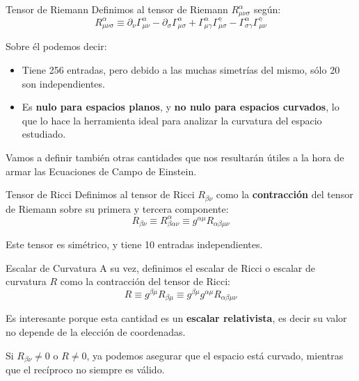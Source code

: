 \begin{remarkbox}{Tensor de Riemann}
        Definimos al tensor de Riemann $R^\alpha_{\mu \nu \sigma}$ según:
        \begin{equation}
            R^\alpha_{\mu \nu \sigma}\equiv\partial_{\nu}\Gamma^{\alpha}_{\mu \nu}-\partial_{\sigma}\Gamma^{\alpha}_{\mu\sigma}+\Gamma^{\alpha}_{\mu\gamma}\Gamma^{\gamma}_{\mu\sigma}-\Gamma^{\alpha}_{\sigma\gamma}\Gamma^{\gamma}_{\mu\nu}
            \label{riemann}
        \end{equation}
        
        Sobre él podemos decir:
        \begin{itemize}
            \item Tiene 256 entradas, pero debido a las muchas simetrías del mismo, sólo 20 son independientes.
            \item Es \textbf{nulo para espacios planos}, y \textbf{no nulo para espacios curvados}, lo que lo hace la herramienta ideal para analizar la curvatura del espacio estudiado.
        \end{itemize}
\end{remarkbox}

Vamos a definir también otras cantidades que nos resultarán útiles a la hora de armar las Ecuaciones de Campo de Einstein.

\begin{remarkbox}{Tensor de Ricci}
        Definimos al tensor de Ricci $R_{\beta\nu}$ como la \textbf{contracción} del tensor de Riemann sobre su primera y tercera componente:
        \begin{equation}
            R_{\beta\nu} \equiv R^\alpha_{\beta \alpha \nu} \equiv g^{\alpha \mu} R_{\alpha\beta\mu\nu}
            \label{ricci}
        \end{equation}
        
        Este tensor es simétrico, y tiene 10 entradas independientes.
\end{remarkbox}

\begin{remarkbox}{Escalar de Curvatura}
        A su vez, definimos el escalar de Ricci o escalar de curvatura $R$ como la contracción del tensor de Ricci:
        \begin{equation}
            R \equiv g^{\beta\mu}R_{\beta\mu}\equiv g^{\beta\mu}g^{\alpha \mu} R_{\alpha\beta\mu\nu}
        \end{equation}
        
        Es interesante porque esta cantidad es un \textbf{escalar relativista}, es decir su valor no depende de la elección de coordenadas.
        
        Si $R_{\beta\nu} \neq 0$ o $R\neq 0$, ya podemos asegurar que el espacio está curvado, mientras que el recíproco no siempre es válido.
\end{remarkbox}



